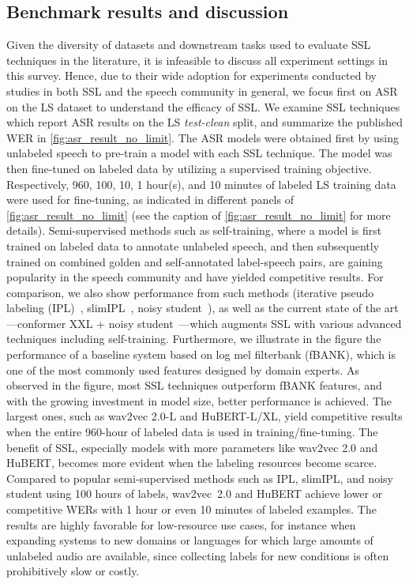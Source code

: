 \subsection{Benchmark results and discussion} \label{sec:benchmark} 
Given the diversity of datasets and downstream tasks used to evaluate SSL
techniques in the literature, it is infeasible to discuss all 
experiment settings in this survey. Hence, due to their wide adoption for
experiments conducted by studies in both SSL and the speech community in
general, we focus first on ASR on the LS dataset to understand the
efficacy of SSL. We examine SSL techniques which report ASR results on the LS
\textit{test-clean} split, and summarize the published WER in
\cref{fig:asr_result_no_limit}. The ASR models were obtained first by using
unlabeled speech to pre-train a model with each SSL technique. The model was
then fine-tuned on labeled data by utilizing a supervised training objective.
Respectively, 960, 100, 10, 1 hour(s), and 10 minutes of labeled LS training data
were used for fine-tuning, as indicated in different panels of
\cref{fig:asr_result_no_limit} (see
the caption of \cref{fig:asr_result_no_limit} for more details).
Semi-supervised methods such as self-training, where a model is first trained
on labeled data to annotate unlabeled speech, and then subsequently trained on
combined golden and self-annotated label-speech pairs, are gaining popularity
in the speech community and have yielded competitive results. For comparison, we also
show performance from such methods (iterative pseudo labeling 
(IPL)~\parencite{xu_iterative_2020}, slimIPL~\parencite{likhomanenko_slimipl_2021}, noisy 
student~\parencite{park_improved_2020}), as well as the current state of the art---conformer XXL + noisy
student~\parencite{zhang_pushing_2020}---which augments SSL with various advanced
techniques including self-training. Furthermore, we illustrate in the figure
the performance of a baseline system \parencite{yang_superb_2021} based on log mel filterbank (fBANK), which is one of the most commonly used features designed by domain experts.
As observed in the figure, most SSL techniques outperform fBANK
features, and with the growing investment in model size, better performance is
achieved. The largest ones, such as wav2vec 2.0-L and HuBERT-L/XL, yield competitive results 
when the entire 960-hour of labeled data is used in
training/fine-tuning. The benefit of SSL, especially models with more parameters
like wav2vec 2.0 and HuBERT, becomes more evident when the labeling resources
become scarce. Compared to popular semi-supervised methods such as IPL,
slimIPL, and noisy student using 100 hours of labels, wav2vec~2.0 and HuBERT
achieve lower or competitive WERs with 1 hour or even 10 minutes of labeled
examples. The results are highly favorable for low-resource use cases, for instance when
expanding systems to new domains or languages for which large amounts of unlabeled
audio are available, since collecting labels for new conditions is often prohibitively
slow or costly.

